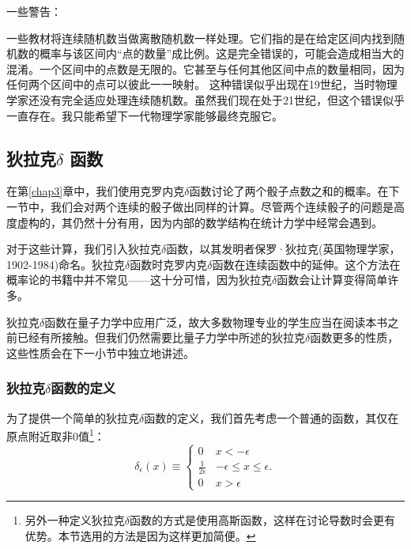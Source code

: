 \documentclass[UTF8]{ctexart}
\numberwithin{equation}{section}%
\numberwithin{figure}{section}%
\begin{document}
    \begin{mdframed}[backgroundcolor=lightgray,hidealllines=true]
    一些警告：
    
    一些教材将连续随机数当做离散随机数一样处理。它们指的是在给定区间内找到随机数的概率与该区间内“点的数量”成比例。这是完全错误的，可能会造成相当大的混淆。一个区间中的点数是无限的。它甚至与任何其他区间中点的数量相同，因为任何两个区间中的点可以彼此一一映射。
    这种错误似乎出现在19世纪，当时物理学家还没有完全适应处理连续随机数。虽然我们现在处于21世纪，但这个错误似乎一直存在。我只能希望下一代物理学家能够最终克服它。
    \end{mdframed}
    \subsection{\texorpdfstring{狄拉克$\delta$ 函数}{狄拉克delta函数}}\label{sec5.3}
    在第\ref{chap3}章中，我们使用克罗内克$\delta$函数讨论了两个骰子点数之和的概率。在下一节中，我们会对两个连续的骰子做出同样的计算。尽管两个连续骰子的问题是高度虚构的，其仍然十分有用，因为内部的数学结构在统计力学中经常会遇到。
    
    对于这些计算，我们引入狄拉克$\delta$函数，以其发明者保罗·狄拉克(英国物理学家，1902-1984)命名。狄拉克$\delta$函数时克罗内克$\delta$函数在连续函数中的延伸。这个方法在概率论的书籍中并不常见——这十分可惜，因为狄拉克$\delta$函数会让计算变得简单许多。

    狄拉克$\delta$函数在量子力学中应用广泛，故大多数物理专业的学生应当在阅读本书之前已经有所接触。但我们仍然需要比量子力学中所述的狄拉克$\delta$函数更多的性质，这些性质会在下一小节中独立地讲述。

    \subsubsection{\texorpdfstring{狄拉克$\delta$函数的定义}{狄拉克delta函数的定义}}
    为了提供一个简单的狄拉克$\delta$函数的定义，我们首先考虑一个普通的函数，其仅在原点附近取非0值\footnote{另外一种定义狄拉克$\delta$函数的方式是使用高斯函数，这样在讨论导数时会更有优势。本节选用的方法是因为这样更加简便。}：
    \begin{equation*}
        \delta_{\epsilon}(x) \equiv\left\{\begin{array}{ll}
            0 & x<-\epsilon \\
            \frac{1}{2 \epsilon} & -\epsilon \leq x \leq \epsilon . \\
            0 & x>\epsilon
            \end{array}\right.
    \end{equation*}
\end{document}
